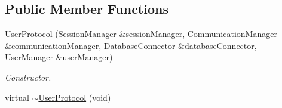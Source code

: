 \subsection*{Public Member Functions}
\begin{DoxyCompactItemize}
\item 
\hyperlink{class_user_protocol_ad8692b2f1941f5bff1688af61e5286a6}{User\-Protocol} (\hyperlink{class_session_manager}{Session\-Manager} \&session\-Manager, \hyperlink{class_communication_manager}{Communication\-Manager} \&communication\-Manager, \hyperlink{class_database_connector}{Database\-Connector} \&database\-Connector, \hyperlink{class_user_manager}{User\-Manager} \&user\-Manager)
\begin{DoxyCompactList}\small\item\em Constructor. \end{DoxyCompactList}\item 
\hypertarget{class_user_protocol_a07b070be1cb9c8d3b9f6f6192e27b33e}{virtual \hyperlink{class_user_protocol_a07b070be1cb9c8d3b9f6f6192e27b33e}{$\sim$\-User\-Protocol} (void)}\label{class_user_protocol_a07b070be1cb9c8d3b9f6f6192e27b33e}


\end{DoxyCompactItemize}
